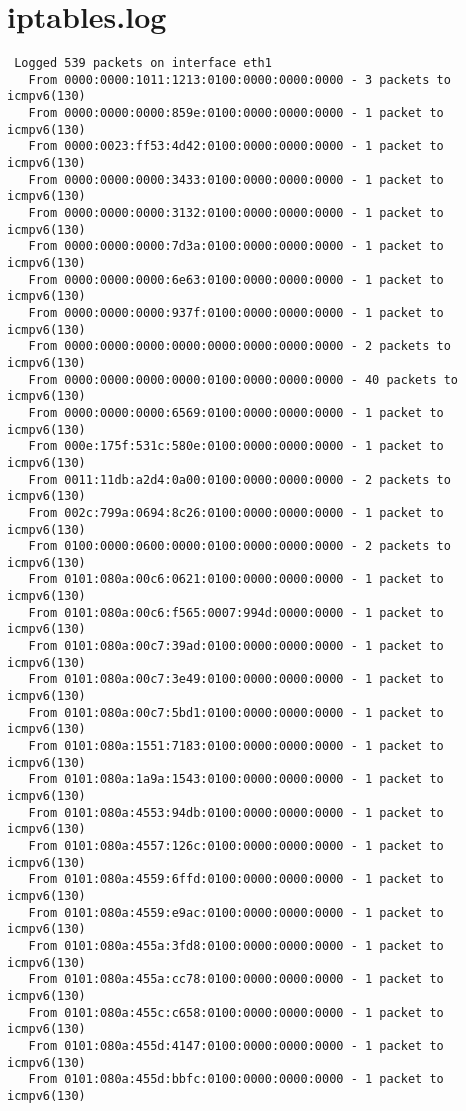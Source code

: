 \section{iptables.log}
\label{sec:iptables.log}
\begin{lstlisting}
 Logged 539 packets on interface eth1
   From 0000:0000:1011:1213:0100:0000:0000:0000 - 3 packets to icmpv6(130)
   From 0000:0000:0000:859e:0100:0000:0000:0000 - 1 packet to icmpv6(130)
   From 0000:0023:ff53:4d42:0100:0000:0000:0000 - 1 packet to icmpv6(130)
   From 0000:0000:0000:3433:0100:0000:0000:0000 - 1 packet to icmpv6(130)
   From 0000:0000:0000:3132:0100:0000:0000:0000 - 1 packet to icmpv6(130)
   From 0000:0000:0000:7d3a:0100:0000:0000:0000 - 1 packet to icmpv6(130)
   From 0000:0000:0000:6e63:0100:0000:0000:0000 - 1 packet to icmpv6(130)
   From 0000:0000:0000:937f:0100:0000:0000:0000 - 1 packet to icmpv6(130)
   From 0000:0000:0000:0000:0000:0000:0000:0000 - 2 packets to icmpv6(130)
   From 0000:0000:0000:0000:0100:0000:0000:0000 - 40 packets to icmpv6(130)
   From 0000:0000:0000:6569:0100:0000:0000:0000 - 1 packet to icmpv6(130)
   From 000e:175f:531c:580e:0100:0000:0000:0000 - 1 packet to icmpv6(130)
   From 0011:11db:a2d4:0a00:0100:0000:0000:0000 - 2 packets to icmpv6(130)
   From 002c:799a:0694:8c26:0100:0000:0000:0000 - 1 packet to icmpv6(130)
   From 0100:0000:0600:0000:0100:0000:0000:0000 - 2 packets to icmpv6(130)
   From 0101:080a:00c6:0621:0100:0000:0000:0000 - 1 packet to icmpv6(130)
   From 0101:080a:00c6:f565:0007:994d:0000:0000 - 1 packet to icmpv6(130)
   From 0101:080a:00c7:39ad:0100:0000:0000:0000 - 1 packet to icmpv6(130)
   From 0101:080a:00c7:3e49:0100:0000:0000:0000 - 1 packet to icmpv6(130)
   From 0101:080a:00c7:5bd1:0100:0000:0000:0000 - 1 packet to icmpv6(130)
   From 0101:080a:1551:7183:0100:0000:0000:0000 - 1 packet to icmpv6(130)
   From 0101:080a:1a9a:1543:0100:0000:0000:0000 - 1 packet to icmpv6(130)
   From 0101:080a:4553:94db:0100:0000:0000:0000 - 1 packet to icmpv6(130)
   From 0101:080a:4557:126c:0100:0000:0000:0000 - 1 packet to icmpv6(130)
   From 0101:080a:4559:6ffd:0100:0000:0000:0000 - 1 packet to icmpv6(130)
   From 0101:080a:4559:e9ac:0100:0000:0000:0000 - 1 packet to icmpv6(130)
   From 0101:080a:455a:3fd8:0100:0000:0000:0000 - 1 packet to icmpv6(130)
   From 0101:080a:455a:cc78:0100:0000:0000:0000 - 1 packet to icmpv6(130)
   From 0101:080a:455c:c658:0100:0000:0000:0000 - 1 packet to icmpv6(130)
   From 0101:080a:455d:4147:0100:0000:0000:0000 - 1 packet to icmpv6(130)
   From 0101:080a:455d:bbfc:0100:0000:0000:0000 - 1 packet to icmpv6(130)

\end{lstlisting}
